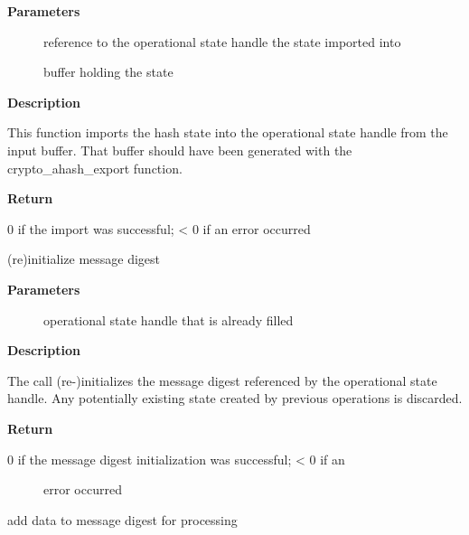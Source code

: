 \documentclass[a4paper,8pt,english]{sphinxmanual}
\begin{document}
\textbf{Parameters}
\begin{description}
\item[{}] \leavevmode
reference to the operational state handle the state imported into

\item[{}] \leavevmode
buffer holding the state

\end{description}

\textbf{Description}

This function imports the hash state into the operational state handle from
the input buffer. That buffer should have been generated with the
crypto\_ahash\_export function.

\textbf{Return}

0 if the import was successful; \textless{} 0 if an error occurred

\begin{fulllineitems}
\label{crypto/api-digest:c.crypto_shash_init}
(re)initialize message digest

\end{fulllineitems}


\textbf{Parameters}
\begin{description}
\item[{}] \leavevmode
operational state handle that is already filled

\end{description}

\textbf{Description}

The call (re-)initializes the message digest referenced by the
operational state handle. Any potentially existing state created by
previous operations is discarded.

\textbf{Return}
\begin{description}
\item[{0 if the message digest initialization was successful; \textless{} 0 if an}] \leavevmode
error occurred

\end{description}

\begin{fulllineitems}
\label{crypto/api-digest:c.crypto_shash_update}
add data to message digest for processing

\end{fulllineitems}
\end{document}
